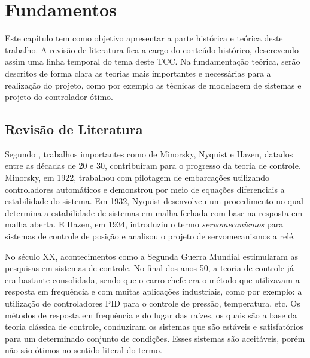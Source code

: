 \chapter{Fundamentos}\label{cap:Fundamentos}

Este capítulo tem como objetivo apresentar a parte histórica e teórica deste trabalho. A revisão de literatura fica a cargo do conteúdo histórico, descrevendo assim uma linha temporal do tema deste TCC. Na fundamentação teórica, serão descritos de forma clara as teorias mais importantes e necessárias para a realização do projeto, como por exemplo as técnicas de modelagem de sistemas e projeto do controlador ótimo.

\section{Revisão de Literatura}

Segundo \cite{Ogata}, trabalhos importantes como de Minorsky, Nyquist e Hazen, datados entre as décadas de 20 e 30, contribuíram para o progresso da teoria de controle. Minorsky, em 1922, trabalhou com pilotagem de embarcações utilizando controladores automáticos e demonstrou por meio de equações diferenciais a estabilidade do sistema. Em 1932, Nyquist desenvolveu um procedimento no qual determina a estabilidade de sistemas em malha fechada com base na resposta em malha aberta. E Hazen, em 1934, introduziu o termo \textit{servomecanismos} para sistemas de controle de posição e analisou o projeto de servomecanismos a relé.

No século XX, acontecimentos como a Segunda Guerra Mundial estimularam as pesquisas em sistemas de controle. No final dos anos 50, a teoria de controle já era bastante consolidada, sendo que o carro chefe era o método que utilizavam a resposta em frequência e com muitas aplicações industriais, como por exemplo: a utilização de controladores PID para o controle de pressão, temperatura, etc. Os métodos de resposta em frequência e do lugar das raízes, os quais são a base da teoria clássica de controle, conduziram os sistemas que são estáveis e satisfatórios para um determinado conjunto de condições. Esses sistemas são aceitáveis, porém não são ótimos no sentido literal do termo. 

